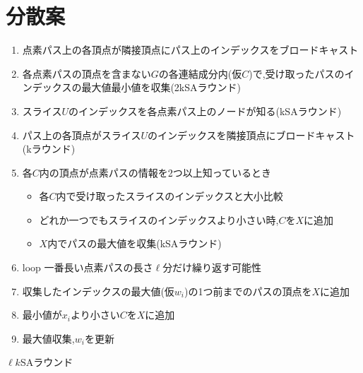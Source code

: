 \documentclass{jarticle}
\theoremstyle{definition}
\begin{document}
\section*{分散案}
\begin{enumerate}
  \item 点素パス上の各頂点が隣接頂点にパス上のインデックスをブロードキャスト
  \item 各点素パスの頂点を含まない$G$の各連結成分内(仮$C$)で,受け取ったパスのインデックスの最大値最小値を収集(2kSAラウンド)
  \item スライス$U$のインデックスを各点素パス上のノードが知る(kSAラウンド)
  \item パス上の各頂点がスライス$U$のインデックスを隣接頂点にブロードキャスト(kラウンド)
  \item 各$C$内の頂点が点素パスの情報を2つ以上知っているとき
  \begin{itemize}
    \item 各$C$内で受け取ったスライスのインデックスと大小比較
    \item どれか一つでもスライスのインデックスより小さい時,$C$を$X$に追加
    \item $X$内でパスの最大値を収集(kSAラウンド)
  \end{itemize}
  \item loop 一番長い点素パスの長さ$\ell$分だけ繰り返す可能性
  \item 収集したインデックスの最大値(仮$w_i$)の1つ前までのパスの頂点を$X$に追加
  \item 最小値が$x_i$より小さい$C$を$X$に追加
  \item 最大値収集,$w_i$を更新
\end{enumerate}
$\ell k$SAラウンド 
\end{document}
